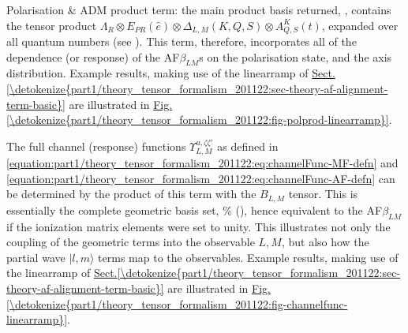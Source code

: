 \documentclass[letterpaper,table,10pt,english]{jupyterBook}
\begin{document}
\sphinxAtStartPar
Polarisation \& ADM product term: the main product basis returned, , contains the tensor product \(\Lambda_{R}\otimes E_{PR}(\hat{e})\otimes \Delta_{L,M}(K,Q,S)\otimes A^{K}_{Q,S}(t)\), expanded over all quantum numbers (see ). This term, therefore, incorporates all of the dependence (or response) of the AF\sphinxhyphen{}\(\beta_{LM}\)s on the polarisation state, and the axis distribution. Example results, making use of the linear\sphinxhyphen{}ramp {\hyperref[\detokenize{backmatter/glossary:term-ADMs}]{}} of \hyperref[\detokenize{part1/theory_tensor_formalism_201122:sec-theory-af-alignment-term-basic}]{Sect.\@ \ref{\detokenize{part1/theory_tensor_formalism_201122:sec-theory-af-alignment-term-basic}}} are illustrated in \hyperref[\detokenize{part1/theory_tensor_formalism_201122:fig-polprod-linearramp}]{Fig.\@ \ref{\detokenize{part1/theory_tensor_formalism_201122:fig-polprod-linearramp}}}.

\sphinxAtStartPar
The full channel (response) functions \(\varUpsilon_{L,M}^{u,\zeta\zeta'}\) as defined in \eqref{equation:part1/theory_tensor_formalism_201122:eq:channelFunc-MF-defn} and \eqref{equation:part1/theory_tensor_formalism_201122:eq:channelFunc-AF-defn} can be determined by the product of this term with the \(B_{L,M}\) tensor. This is essentially the complete geometric basis set, \% (),
hence equivalent to the AF\sphinxhyphen{}\(\beta_{LM}\) if the ionization matrix elements were set to unity. This illustrates not only the coupling of the geometric terms into the observable \(L,M\), but also how the partial wave \(|l,m\rangle\) terms map to the observables. Example results, making use of the linear\sphinxhyphen{}ramp {\hyperref[\detokenize{backmatter/glossary:term-ADMs}]{}} of \hyperref[\detokenize{part1/theory_tensor_formalism_201122:sec-theory-af-alignment-term-basic}]{Sect.\@ \ref{\detokenize{part1/theory_tensor_formalism_201122:sec-theory-af-alignment-term-basic}}} are illustrated in \hyperref[\detokenize{part1/theory_tensor_formalism_201122:fig-channelfunc-linearramp}]{Fig.\@ \ref{\detokenize{part1/theory_tensor_formalism_201122:fig-channelfunc-linearramp}}}.
\end{document}
